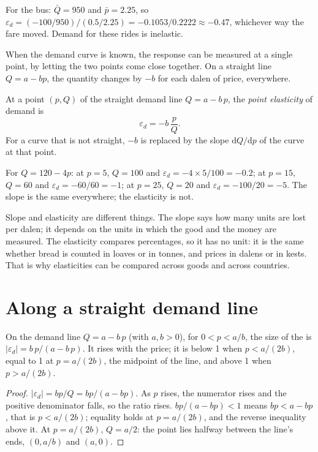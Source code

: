 For the bus: $\bar Q = 950$ and $\bar p = 2.25$, so $\varepsilon_d = (-100/950)/(0.5/2.25) = -0.1053/0.2222 \approx -0.47$, whichever way
the fare moved. Demand for these rides is inelastic.

When the demand curve is known, the response can be measured at a single point, by letting the two points come close together. On a
straight line $Q = a - bp$, the quantity changes by $-b$ for each dalen of price, everywhere.

\begin{definition}\label{def:g10:elasticities:point}
At a point $(p, Q)$ of the straight demand line $Q = a - b\,p$, the \emph{point elasticity} of demand is
\[
  \varepsilon_d = -b \, \frac{p}{Q}.
\]
For a curve that is not straight, $-b$ is replaced by the slope $\mathrm{d}Q/\mathrm{d}p$ of the curve at that point.
\end{definition}

\begin{example}\label{ex:g10:elasticities:line}
For $Q = 120 - 4p$: at $p = 5$, $Q = 100$ and $\varepsilon_d = -4 \times 5/100 = -0.2$; at $p = 15$, $Q = 60$ and $\varepsilon_d = -60/60 =
-1$; at $p = 25$, $Q = 20$ and $\varepsilon_d = -100/20 = -5$. The slope is the same everywhere; the elasticity is not.
\end{example}

Slope and elasticity are different things. The slope says how many units are lost per dalen; it depends on the units in which the good
and the money are measured. The elasticity compares percentages, so it has no unit: it is the same whether bread is counted in loaves or
in tonnes, and prices in dalens or in kests. That is why elasticities can be compared across goods and across countries.

\section{Along a straight demand line}\label{sec:g10:elasticities:line}

\begin{proposition}\label{prop:g10:elasticities:midpoint}
On the demand line $Q = a - b\,p$ (with $a, b > 0$), for $0 < p < a/b$, the size of the  is $|\varepsilon_d| = b\,p/(a -
b\,p)$. It rises with the price; it is below 1 when $p < a/(2b)$, equal to 1 at $p = a/(2b)$, the midpoint of the line, and above 1 when $p >
a/(2b)$.
\end{proposition}
\begin{proof}
$|\varepsilon_d| = bp/Q = bp/(a - bp)$. As $p$ rises, the numerator rises and the positive denominator falls, so the ratio rises.
$bp/(a - bp) < 1$ means $bp < a - bp$, that is $p < a/(2b)$; equality holds at $p = a/(2b)$, and the reverse inequality above it. At $p =
a/(2b)$, $Q = a/2$: the point lies halfway between the line's ends, $(0, a/b)$ and $(a, 0)$.
\end{proof}

